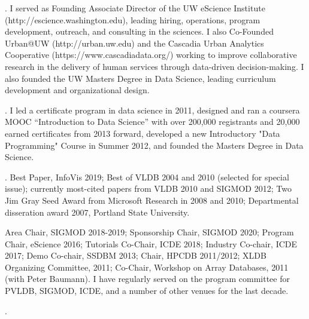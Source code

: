 \documentclass[10pt]{article}
\begin{document}
\begin{cv}{}
. I served as Founding Associate Director of the UW eScience Institute (http://escience.washington.edu), leading hiring, operations, program development, outreach, and consulting in the sciences.  
I also Co-Founded Urban@UW (http://urban.uw.edu) and the Cascadia Urban Analytics Cooperative (https://www.cascadiadata.org/) working to improve collaborative research in the delivery of human services through data-driven decision-making.  I also founded the UW Masters Degree in Data Science, leading curriculum development and organizational design.

\vspace{0.5em}
. I led a certificate program in data science in 2011, designed and ran a coursera MOOC ``Introduction to Data Science'' with over 200,000 registrants and 20,000 earned certificates from 2013 forward, developed a new Introductory "Data Programming" Course in Summer 2012, and founded the Masters Degree in Data Science.

\vspace{0.5em}
.  Best Paper, InfoVis 2019; Best of VLDB 2004 and 2010 (selected for special issue); currently most-cited papers from VLDB 2010 and SIGMOD 2012; Two Jim Gray Seed Award from Microsoft Research in 2008 and 2010; Departmental disseration award 2007, Portland State University.

\vspace{0.5em}
 Area Chair, SIGMOD 2018-2019; Sponsorship Chair, SIGMOD 2020; Program Chair, eScience 2016; Tutorials Co-Chair, ICDE 2018; Industry Co-chair, ICDE 2017; Demo Co-chair, SSDBM 2013; Chair, HPCDB 2011/2012; XLDB Organizing Committee, 2011; Co-Chair, Workshop on Array Databases, 2011 (with Peter Baumann).
I have regularly served on the program committee for PVLDB, SIGMOD, ICDE, and a number of other venues for the last decade.

\vspace{0.5em}
.

\end{cv}
\end{document}
